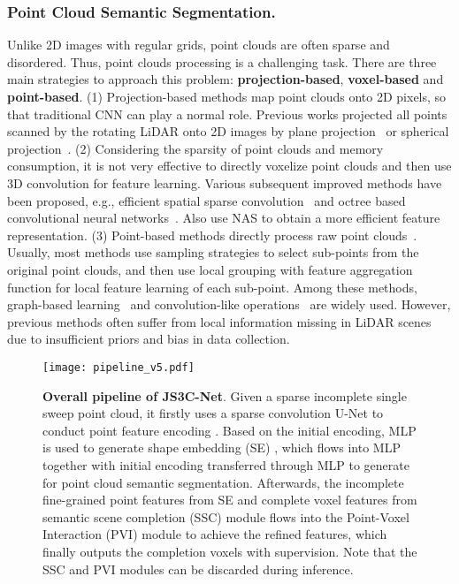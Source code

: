 \documentclass[letterpaper]{article} \usepackage{aaai21}  \usepackage{times}  \usepackage{helvet} \usepackage{courier}  \usepackage[hyphens]{url}  \usepackage{graphicx} \urlstyle{rm} \def\UrlFont{\rm}  \usepackage{natbib}  \usepackage{booktabs}
\begin{document}
	\subsubsection{Point Cloud Semantic Segmentation.} Unlike 2D images with regular grids, point clouds are often sparse and disordered. Thus, point clouds processing is a challenging task. There are three main strategies to approach this problem: \textbf{projection-based}, \textbf{voxel-based} and \textbf{point-based}. 
(1) Projection-based methods map point clouds onto 2D pixels, so that traditional CNN can play a normal role. Previous works projected all points scanned by the rotating LiDAR onto 2D images by plane projection~\cite{lawin2017deep, boulch2017unstructured, tatarchenko2018tangent} or spherical projection~\cite{wu2018squeezeseg,wu2019squeezesegv2}. 
(2) Considering the sparsity of point clouds and memory consumption, it is not very effective to directly voxelize point clouds and then use 3D convolution for feature learning. Various subsequent improved methods have been proposed, e.g.,  efficient spatial sparse convolution~\cite{choy20194d, SparseConv} and octree based convolutional neural networks~\cite{wang2017cnn,riegler2017octnet}. Also \cite{tang2020searching} use NAS to obtain a more efficient feature representation. 
(3) Point-based methods directly process raw point clouds~\cite{qi2017pointnet,qi2017pointnet++}.  Usually, most methods use sampling strategies to select sub-points from the original point clouds, and then use local grouping with feature aggregation function for local feature learning of each sub-point. Among these methods, graph-based
	learning~\cite{wang2019graph,landrieu2018large,landrieu2019point,DGCNN} and convolution-like operations~\cite{Thomas_2019_ICCV,PointConv,hu2019randla} are widely used. However, previous methods often suffer from local information missing in LiDAR scenes due to insufficient priors and bias in data collection.
	
	\begin{figure*}[t]
		
		\noindent\texttt{[image: pipeline\_v5.pdf]}
		
		\caption{{\bf Overall pipeline of JS3C-Net}. Given a sparse incomplete single sweep point cloud, it firstly uses a sparse convolution U-Net to conduct point feature encoding . 
Based on the initial encoding, MLP is used to generate shape embedding (SE) , which flows into MLP together with initial encoding transferred through MLP to generate  for point cloud semantic segmentation.
Afterwards, the incomplete fine-grained point features from SE and complete voxel features from semantic scene completion (SSC) module flows into the Point-Voxel Interaction (PVI) module to achieve the refined features, which finally outputs the completion voxels with supervision.
Note that the SSC and PVI modules can be discarded during inference. 
	}


\label{fig:fig2}
		
	\end{figure*}
	
\end{document}
